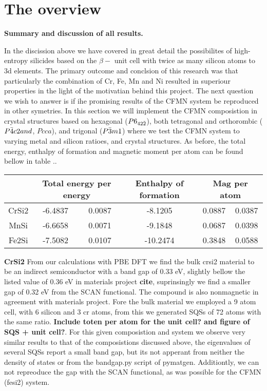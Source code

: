 \chapter{The overview}
\label{sec:overview}

\textbf{Summary and discussion of all results.}

In the discission above we have covered in great detail the possibilites of high-entropy silicides based on the $\beta-$  unit cell with twice as many silicon atoms to 3d elements. The primary outcome and conclsion of this research was that particularly the combination of Cr, Fe, Mn and Ni resulted in superiour properties in the light of the motivatian behind this project. The next question we wish to answer is if ihe promising results of the CFMN system be reproduced in other symetries. In this section we will implement the CFMN composistion in crystal structures based on hexagonal  ($P6_{42\Bar{2}}$), both tetragonal and orthorombic  ($P\Bar{4}c2 and$, $Pcca$), and trigonal  ($P\Bar{3}m1$) where we test the CFMN system to varying metal and silicon ratioes, and crystal structures. As before, the total energy, enthalpy of formation and magnetic moment per atom can be found bellow in table ..
\begin{table}[h!]
\begin{tabular}{@{}cccccc@{}}
\toprule
            & \multicolumn{2}{c}{Total energy per energy} & Enthalpy of formation & \multicolumn{2}{c}{Mag per atom} \\ \midrule
CrSi2       & -6.4837               & 0.0087              & -8.1205             & 0.0887          & 0.0387         \\
MnSi        & -6.6658               & 0.0071              & -9.1848             & 0.0687          & 0.0398         \\
Fe2Si       & -7.5082               & 0.0107              & -10.2474            & 0.3848          & 0.0588         \\ \bottomrule
\end{tabular}
\end{table}

\textbf{CrSi2}
From our calculations with PBE DFT we find the bulk crsi2 material to be an indirect semiconductor with a band gap of 0.33 eV, slightly bellow the listed value of 0.36 eV in materials project \textbf{cite}, suprinsingly we find a smaller gap of 0.32 eV from the SCAN functional. The compound is also nonmagnetic in agreement with materials project. Fore the bulk material we employed a 9 atom cell, with 6 silicon and 3 cr atoms, from this we generated SQSs of 72 atoms with the same ratio.  \textbf{Include toten per atom for the unit cell? and figure of SQS + unit cell?}. For this given composistion and system we observe very similar results to that of the composistions discussed above, the eigenvalues of several SQSs report a small band gap, but its not apperant from neither the density of states or from the bandgap.py script of pymatgen. Additiontly, we can not repreoduce the gap with the SCAN functional, as was possible for the CFMN (fesi2) system.   

